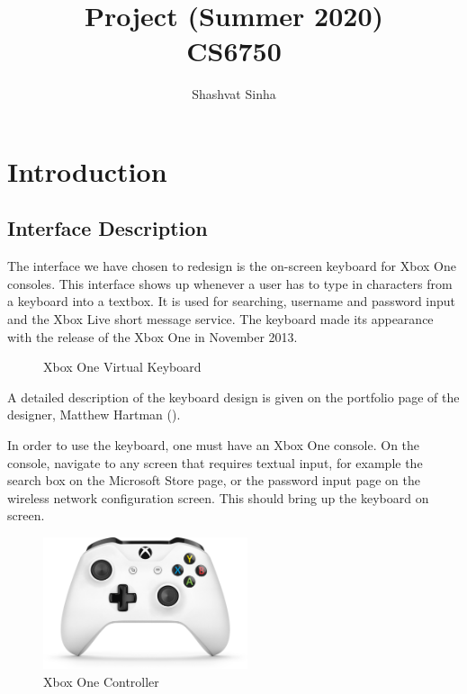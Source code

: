 \documentclass[
	letterpaper, %
]{jdf}
\author{Shashvat Sinha}
\title{Project (Summer 2020)\\CS6750}
\begin{document}

\maketitle

\section{Introduction}
\subsection{Interface Description}
The interface we have chosen to redesign is the on-screen keyboard for Xbox One consoles. This interface shows up whenever a user has to type in characters from a keyboard into a textbox. It is used for searching, username and password input and the Xbox Live short message service. The keyboard made its appearance with the release of the Xbox One in November 2013.

\begin{figure}[h]
	\centering
	\caption{Xbox One Virtual Keyboard}
	\label{fig:xb1keyboard}
\end{figure}


A detailed description of the keyboard design is given on the portfolio page of the designer, Matthew Hartman (\cite{hartman_2013}).


In order to use the keyboard, one must have an Xbox One console. On the console, navigate to any screen that requires textual input, for example the search box on the Microsoft Store page, or the password input page on the wireless network configuration screen. This should bring up the keyboard on screen.

\begin{figure}[h]
	\centering
	\includegraphics[width=6cm]{jdf-master/Figures/xbox-one-controller.png}
	\caption{Xbox One Controller}
	\label{fig:xb1controller}
\end{figure}
\end{document}

